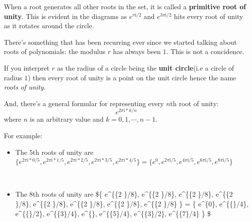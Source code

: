 \documentclass[11pt]{article}
\providecommand{\tightlist}{%
      \setlength{\itemsep}{0pt}\setlength{\parskip}{0pt}}
\begin{document}
When a root generates all other roots in the set, it is called a
\textbf{primitive root of unity}. This is evident in the diagrams as
\(e^{\pi\mathrm{i}/{2}}\) and \(e^{3\pi\mathrm{i}/{2}}\) hits every root
of unity as it rotates around the circle.

There's something that has been recurring ever since we started talking
about roots of polynomials: the modulus \(r\) has always been \(1\).
This is not a concidence.

If you interpret \(r\) as the radius of a circle being the \textbf{unit
circle}(i.e a circle of radius \(1\)) then every root of unity is a
point on the unit circle hence the name \emph{roots of unity}.

And, there's a general formular for representing every \(n\)th root of
unity: \[e^{{2\pi\mathrm{i} \ast k}/n}\] where \(n\) is an arbitrary
value and \(k = 0, 1, \cdots, n - 1\).

For example:

\begin{itemize}
\tightlist
\item
  The \(5\)th roots of unity are
  \(\{e^{{2\pi\mathrm{i} \ast 0}/5}, e^{{2\pi\mathrm{i}\ast 1}/5}, e^{{2\pi\mathrm{i} \ast 2}/5}, e^{{2\pi\mathrm{i} \ast 3}/5}, e^{{2\pi\mathrm{i} \ast 4}/5}\} = \{e^0, e^{{2\pi\mathrm{i}}/5}, e^{{4\pi\mathrm{i}}/5}, e^{{6\pi\mathrm{i}}/5}, e^{{8\pi\mathrm{i}}/5}\}\)
\end{itemize}

    \begin{center}
    \end{center}
    { \hspace*{\fill} \\}
    
    \begin{itemize}
\tightlist
\item
  The \(8\)th roots of unity are \$\{ e\^{}\{\{2\pi{}
  \}/8\}, e\^{}\{\{2\pi{} \}/8\},
  e\^{}\{\{2\pi{} \}/8\}, e\^{}\{\{2\pi{}
  \}/8\}, e\^{}\{\{2\pi{} \}/8\},
  e\^{}\{\{2\pi{} \}/8\}, e\^{}\{\{2\pi{}
  \}/8\}, e\^{}\{\{2\pi{} \}/8\} \} = \{ e\^{}\{0\},
  e\^{}\{\{\pi{}\}/4\}, e\^{}\{\{\pi{}\}/2\},
  e\^{}\{\{3\pi{}\}/4\}, e\^{}\{\pi{}\},
  e\^{}\{\{5\pi{}\}/4\}, e\^{}\{\{3\pi{}\}/2\},
  e\^{}\{\{7\pi{}\}/4\} \} \$
\end{itemize}
\end{document}
